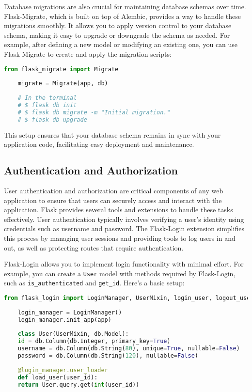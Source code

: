 Database migrations are also crucial for maintaining database schemas over time. Flask-Migrate, which is built on top of Alembic, provides a way to handle these migrations smoothly. It allows you to apply version control to your database schema, making it easy to upgrade or downgrade the schema as needed. For example, after defining a new model or modifying an existing one, you can use Flask-Migrate to create and apply the migration scripts:

\begin{lstlisting}[language=Python]
	from flask_migrate import Migrate
	
	migrate = Migrate(app, db)
	
	# In the terminal
	# $ flask db init
	# $ flask db migrate -m "Initial migration."
	# $ flask db upgrade
\end{lstlisting}

This setup ensures that your database schema remains in sync with your application code, facilitating easy deployment and maintenance.\cite{flaskrestfuldocumentation:2024}

\subsection{Authentication and Authorization}

User authentication and authorization are critical components of any web application to ensure that users can securely access and interact with the application. Flask provides several tools and extensions to handle these tasks effectively. User authentication typically involves verifying a user's identity using credentials such as username and password. The Flask-Login extension simplifies this process by managing user sessions and providing tools to log users in and out, as well as protecting routes that require authentication.\cite{sahaflaskrestful:2024}

Flask-Login allows you to implement login functionality with minimal effort. For example, you can create a \texttt{User} model with methods required by Flask-Login, such as \texttt{is\_authenticated} and \texttt{get\_id}. Here’s a basic setup:

\begin{lstlisting}[language=Python]
	from flask_login import LoginManager, UserMixin, login_user, logout_user, login_required
	
	login_manager = LoginManager()
	login_manager.init_app(app)
	
	class User(UserMixin, db.Model):
	id = db.Column(db.Integer, primary_key=True)
	username = db.Column(db.String(80), unique=True, nullable=False)
	password = db.Column(db.String(120), nullable=False)
	
	@login_manager.user_loader
	def load_user(user_id):
	return User.query.get(int(user_id))
\end{lstlisting}

